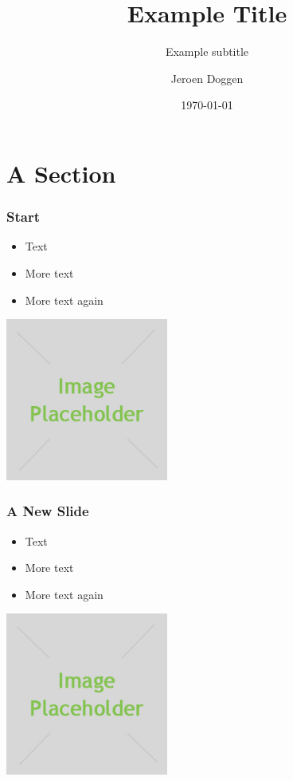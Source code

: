 \documentclass[handout,xcolor=pdftex,dvipsnames,table]{beamer}
\title[]{Example Title}
\subtitle{Example subtitle}
\author{Jeroen Doggen}
\institute{AP University College Antwerpen}
\date{\today}
\begin{document}
\maketitle



\section{A Section}

\begin{frame} 
\frametitle{Start}
\begin{itemize}[<+->]
 \item Text
 \item More text
 \item More text again
\end{itemize}
\begin{center}
  \includegraphics[width=0.4\textwidth]{./placeholder.jpg}
\end{center}
\end{frame}

\begin{frame} 
\frametitle{A New Slide}
\begin{itemize}[<+->]
 \item Text
 \item More text
 \item More text again
\end{itemize}
\begin{center}
  \includegraphics[width=0.4\textwidth]{placeholder.jpg}
\end{center}
\end{frame}
\end{document}
